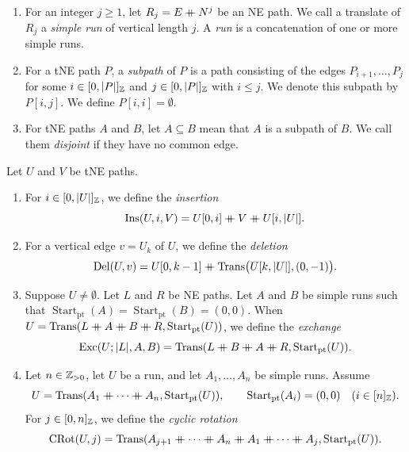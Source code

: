 \begin{definition}
\begin{enumerate}[font=\itshape]
\item For an integer $j\ge1$, let $R_j=E\mathbin{+\mkern-10mu+} N^j$ be an NE path.
We call a translate of $R_j$ a \textit{simple run} of vertical length $j$.
A \textit{run} is a concatenation of one or more simple runs.
\item For a tNE path $P$, a \textit{subpath} of $P$ is a path consisting of the edges
$P_{i+1},\ldots,P_j$ for some $i\in[0,|P|]_{\mathbb Z}$ and $j\in[0,|P|]_{\mathbb Z}$ with $i\le j$.
We denote this subpath by $P[i,j]$.
We define $P[i,i]=\emptyset$.
\item For tNE paths $A$ and $B$, let $A\subseteq B$ mean that $A$ is a subpath of $B$.
We call them \textit{disjoint} if they have no common edge.
\end{enumerate}
\end{definition}



\begin{definition}\label{def:word-operations}
Let $U$ and $V$ be tNE paths.
\begin{enumerate}[font=\itshape]
\item For $i\in[0,|U|]_{\mathbb Z}$, we define the \textit{insertion}
\[
 \operatorname{Ins}(U,i,V)=U[0,i]\mathbin{+\mkern-10mu+} V\mathbin{+\mkern-10mu+} U[i,|U|].
\]
\item For a vertical edge $v=U_k$ of $U$, we define the \textit{deletion}
\[
 \operatorname{Del}(U,v)=U[0,k-1]\mathbin{+\mkern-10mu+}\operatorname{Trans}\bigl(U[k,|U|],(0,-1)\bigr).
\]
\item Suppose $U\ne\emptyset$. Let $L$ and $R$ be NE paths. Let $A$ and $B$ be simple runs such that
$\operatorname{Start}_{\mathrm{pt}}(A)=\operatorname{Start}_{\mathrm{pt}}(B)=(0,0)$.
When $U=\operatorname{Trans}(L\mathbin{+\mkern-10mu+} A\mathbin{+\mkern-10mu+} B\mathbin{+\mkern-10mu+} R,\operatorname{Start}_{\mathrm{pt}}(U))$, we define the \textit{exchange}
\[
 \operatorname{Exc}(U;|L|,A,B)
 =\operatorname{Trans}(L\mathbin{+\mkern-10mu+} B\mathbin{+\mkern-10mu+} A\mathbin{+\mkern-10mu+} R,\operatorname{Start}_{\mathrm{pt}}(U)).
\]
\item Let $n\in\mathbb Z_{>0}$, let $U$ be a run, and let $A_1,\ldots,A_n$ be simple runs. Assume
\[
 U=\operatorname{Trans}(A_1\mathbin{+\mkern-10mu+}\cdots\mathbin{+\mkern-10mu+} A_n,\operatorname{Start}_{\mathrm{pt}}(U)),\qquad
 \operatorname{Start}_{\mathrm{pt}}(A_i)=(0,0)\quad(i\in[n]_{\mathbb Z}).
\]
For $j\in[0,n]_{\mathbb Z}$, we define the
\textit{cyclic rotation}
\[
 \operatorname{CRot}(U,j)=\operatorname{Trans}(A_{j+1}\ccn \cdots\ccn A_n\ccn A_1\ccn \cdots\ccn A_j,\operatorname{Start}_{\mathrm{pt}}(U)).
\]
\end{enumerate}
\end{definition}

